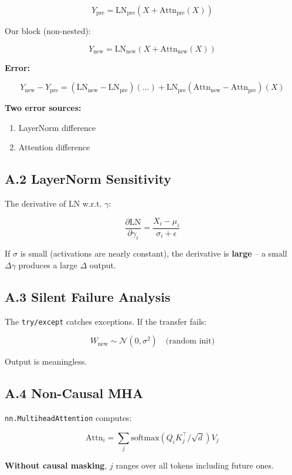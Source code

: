 \[
Y_\text{pre} = \text{LN}_\text{pre}(X + \text{Attn}_\text{pre}(X))
\tag{A.1}
\]

Our block (non-nested):

\[
Y_\text{new} = \text{LN}_\text{new}(X + \text{Attn}_\text{new}(X))
\tag{A.2}
\]

\textbf{Error:}

\[
Y_\text{new} - Y_\text{pre} = (\text{LN}_\text{new} - \text{LN}_\text{pre})(\dots) + \text{LN}_\text{pre}(\text{Attn}_\text{new} - \text{Attn}_\text{pre})(X)
\tag{A.3}
\]

\textbf{Two error sources:}
\begin{enumerate}
\item LayerNorm difference
\item Attention difference

\end{enumerate}
\subsection{A.2 LayerNorm Sensitivity}

The derivative of LN w.r.t. $\gamma$:

\[
\frac{\partial \text{LN}}{\partial \gamma_i} = \frac{X_i - \mu_i}{\sigma_i + \epsilon}
\tag{A.4}
\]

If $\sigma$ is small (activations are nearly constant), the derivative is 
\textbf{large} -- a small $\Delta \gamma$ produces a large $\Delta$ output.

\subsection{A.3 Silent Failure Analysis}

The \texttt{try/except} catches exceptions. If the transfer fails:

\[
W_\text{new} \sim \mathcal{N}(0, \sigma^2) \quad \text{(random init)}
\tag{A.5}
\]

Output is meaningless.

\subsection{A.4 Non-Causal MHA}

\texttt{nn.MultiheadAttention} computes:

\[
\text{Attn}_i = \sum_j \text{softmax}(Q_i K_j^\top / \sqrt{d}) V_j
\tag{A.6}
\]

\textbf{Without causal masking}, $j$ ranges over all tokens including future ones.

